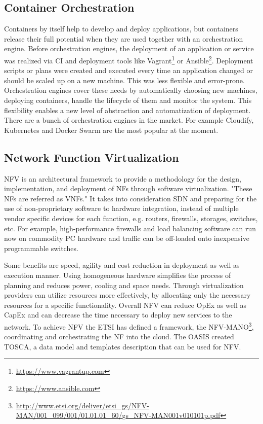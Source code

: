 \subsection{Container Orchestration}
Containers by itself help to develop and deploy applications, but containers release their full potential when they are used together with an orchestration engine.
Before orchestration engines, the deployment of an application or service was realized via \ac{CI} and deployment tools like Vagrant\footnote{\url{https://www.vagrantup.com}} or Ansible\footnote{\url{https://www.ansible.com}}.
Deployment scripts or plans were created and executed every time an application changed or should be scaled up on a new machine.\autocite[cf.][p. 70]{Tosatto:2015}
This was less flexible and error-prone.
Orchestration engines cover these needs by automatically choosing new machines, deploying containers, handle the lifecycle of them and monitor the system.\autocite[cf.][p. 70]{Tosatto:2015}
This flexibility enables a new level of abstraction and automatization of deployment.\autocite[cf.][p. 70]{Tosatto:2015}
There are a bunch of orchestration engines in the market.
For example Cloudify, Kubernetes and Docker Swarm are the most popular at the moment.


\subsection{Network Function Virtualization}
\ac{NFV} is an architectural framework to provide a methodology for the design, implementation, and deployment of \acp{NF} through software virtualization.\autocite[cf.][p. 8]{ETSI:NFV:2013}\autocite[cf.]{Rivenes:2014}
"These \acp{NF} are referred as \acp{VNF}."\autocite[p. 8]{ETSI:NFV:2013}
It takes into consideration \ac{SDN} and preparing for the use of non-proprietary software to hardware integration, instead of multiple vendor specific devices for each function, e.g. routers, firewalls, storages, switches, etc.\autocite[cf.]{Rivenes:2014}
For example, high-performance firewalls and load balancing software can run now on commodity PC hardware and traffic can be off-loaded onto inexpensive programmable switches.\autocite[cf.]{Noble:2015}

Some benefits are speed, agility and cost reduction in deployment as well as execution manner.\autocite[cf.]{Noble:2015}
Using homogeneous hardware simplifies the process of planning and reduces power, cooling and space needs.\autocite[cf.]{Noble:2015}
Through virtualization providers can utilize resources more effectively, by allocating only the necessary resources for a specific functionality.\autocite[cf.]{Noble:2015}
Overall \ac{NFV} can reduce \ac{OpEx} as well as \ac{CapEx} and can decrease the time necessary to deploy new services to the network.\autocite[cf.]{Noble:2015}
To achieve \ac{NFV} the \ac{ETSI} has defined a framework, the \ac{NFV-MANO}\footnote{\url{http://www.etsi.org/deliver/etsi_gs/NFV-MAN/001_099/001/01.01.01_60/gs_NFV-MAN001v010101p.pdf}}, coordinating and orchestrating the \ac{NF} into the cloud.
The \ac{OASIS} created \ac{TOSCA}, a data model and templates description that can be used for \ac{NFV}.

